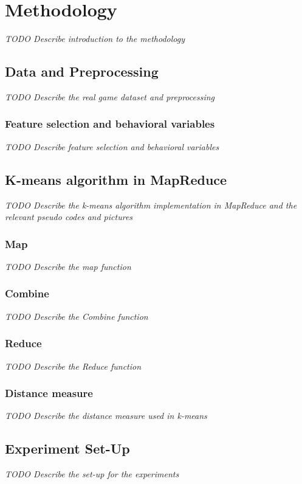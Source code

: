 
\chapter{Methodology} %
\label{Chapter4}

\textit{TODO Describe introduction to the methodology}

\lipsum[1]

\section{Data and Preprocessing}

\textit{TODO Describe the real game dataset and preprocessing}

\lipsum[1-3]

\subsection{Feature selection and behavioral variables}
\textit{TODO Describe feature selection and behavioral variables}

\lipsum[1-3]


\section{K-means algorithm in MapReduce}
\textit{TODO Describe the k-means algorithm implementation in MapReduce and the relevant pseudo codes and pictures}

\lipsum[1-2]

\subsection{Map}
\textit{TODO Describe the map function}

\lipsum[1-2]

\subsection{Combine}
\textit{TODO Describe the Combine function}

\lipsum[5-6]

\subsection{Reduce}
\textit{TODO Describe the Reduce function}

\lipsum[7-8]

\subsection{Distance measure}
\textit{TODO Describe the distance measure used in k-means}

\lipsum[1]


\section{Experiment Set-Up}
\textit{TODO Describe the set-up for the experiments}

\lipsum[1-3]